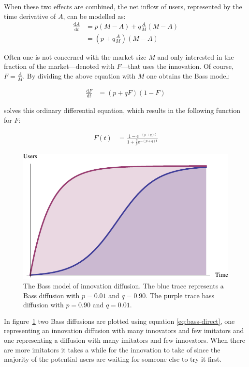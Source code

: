 \documentclass[smallextended,final]{svjour3}
\newcommand{\nd}[2]{\frac{\mathrm{d} #1}{\mathrm{d} #2}}
\newcommand{\e}{\mathrm{e}}
\begin{document}
When these two effects are combined, the net inflow of users, represented by the time derivative of $A$, can be modelled as:
\begin{align*}
\nd{A}{t} &= p(M - A) + q\frac{A}{M}(M - A) \\
&= \left(p + q\frac{A}{M} \right)(M - A)
\end{align*}

Often one is not concerned with the market size $M$ and only interested in the fraction of the market---denoted with $F$---that uses the innovation. Of course, $F=\frac{A}{M}$. By dividing the above equation with $M$ one obtains the Bass model:

\begin{align}\label{eq:bass-ode}
\nd{F}{t} &= \left(p + q F\right)(1 - F)
\end{align}

\citet{bass69} solves this ordinary differential equation, which results in the following function for $F$:

\begin{align}\label{eq:bass-direct}
F(t) &= \frac{1 - \e^{-(p+q)t}}{1+\frac{q}{p}\e^{-(p+q)t}}
\end{align}

\begin{figure}
\small\centering
\includegraphics[width=\linewidth]{Bass.pdf}
\caption[Bass model of innovation diffusion]{The Bass model of innovation diffusion. The blue trace represents a Bass diffusion with $p=0.01$ and $q=0.90$. The purple trace bass diffusion with $p=0.90$ and $q=0.01$.}
\label{fig:bass}
\end{figure}

In figure~\ref{fig:bass} two Bass diffusions are plotted using equation \eqref{eq:bass-direct}, one representing an innovation diffusion with many innovators and few imitators and one representing a diffusion with many imitators and few innovators. When there are more imitators it takes a while for the innovation to take of since the majority of the potential users are waiting for someone else to try it first.
\end{document}
